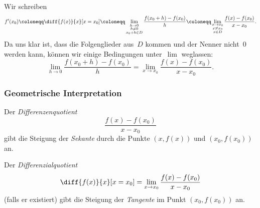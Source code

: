 \documentclass[a4paper]{article}
\begin{document}
\begin{notation}
    Wir schreiben
    \begin{equation*}
        f'(x_0) \coloneqq \diff{f(x)}{x}[x=x_0] \coloneqq \lim_{\substack{h\to0\\ h\neq0\\ x_0+h\in D}} \frac{f(x_0+h)-f(x_0)}{h} \coloneqq \lim_{\substack{x\to x_0\\ x\neq x_0\\ x\in D}} \frac{f(x)-f(x_0)}{x-x_0}.
    \end{equation*}
    Da uns klar ist, dass die Folgenglieder aus~$D$ kommen und der Nenner nicht~$0$ werden kann, können wir einige Bedingungen unter~$\lim$ weglassen:
    \begin{equation*}
        \lim_{h\to0} \frac{f(x_0+h)-f(x_0)}{h} = \lim_{x\to x_0} \frac{f(x)-f(x_0)}{x-x_0}.
    \end{equation*}
\end{notation}

\subsubsection{Geometrische Interpretation}

Der \emph{Differenzenquotient}
\begin{equation*}
    \frac{f(x)-f(x_0)}{x-x_0}
\end{equation*}
gibt die Steigung der \emph{Sekante} durch die Punkte $(x,f(x))$ und $(x_0,f(x_0))$ an.

Der \emph{Differenzialquotient}
\begin{equation*}
    \diff{f(x)}{x}[x=x_0] = \lim_{x\to x_0} \frac{f(x)-f(x_0)}{x-x_0}
\end{equation*}
(falls er existiert) gibt die Steigung der \emph{Tangente} im Punkt $(x_0,f(x_0))$ an.

\begin{center}
\end{center}
\end{document}
